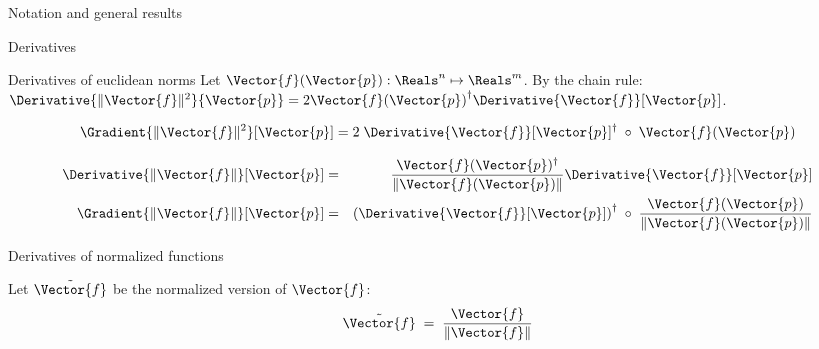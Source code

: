 \begin{plSection}{Notation and general results}
\begin{plSection}{Derivatives}
\begin{plSection}{Derivatives of euclidean norms}
Let $\Vector{f}(\Vector{p}) : \Reals^n \mapsto \Reals^m$.
By the chain rule:
$\Derivative{\| \Vector{f} \|^2}{\Vector{p}}  
=  
2 {\Vector{f}(\Vector{p})}^{\dagger}
 \Derivative{\Vector{f}}[\Vector{p}] $.

\begin{equation}
\Gradient{\| \Vector{f} \|^2}[\Vector{p}]  = 
 2 \;\Derivative{\Vector{f}}[\Vector{p}]^\dagger 
 \;\circ \;\Vector{f}(\Vector{p})
\end{equation}

\begin{eqnarray}
\label{eq:norm_derivative}
\Derivative{\| \Vector{f} \|}[\Vector{p}]
& = &
{{\Vector{f}(\Vector{p})^\dagger} 
\over 
{\| \Vector{f}(\Vector{p}) \|}} 
\Derivative{\Vector{f}}[\Vector{p}]  \\
\Gradient{\| \Vector{f} \|}[\Vector{p}]
& = &
\left(\Derivative{\Vector{f}}[\Vector{p}]\right)^\dagger
 \;\circ \;{{\Vector{f}(\Vector{p})} 
 \over
  { \| \Vector{f}(\Vector{p})  \|}}
\label{eq:norm_gradient}
\end{eqnarray}

\end{plSection}%
\begin{plSection}{Derivatives of normalized functions}
\label{sec:Derivatives-of-normalized-functions}

Let $\tilde{\Vector{f}}$ be the normalized version of $\Vector{f}$:
\begin{equation}
\tilde{\Vector{f}} \;= \;{{\Vector{f}} \over {\| \Vector{f} \|}}
\end{equation}


\end{plSection}
\end{plSection}
\end{plSection}
